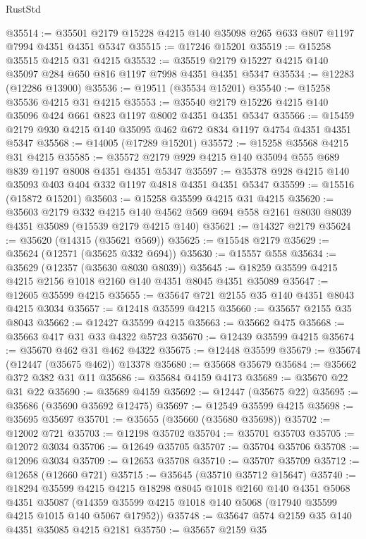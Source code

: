 \begin{lexlean}{RustStd}
\begin{coremodule}
@35514 := @35501 @2179 @15228 @4215 @140 @35098 @265 @633 @807 @1197 @7994 @4351 @4351 @5347
@35515 := @17246 @15201
@35519 := @15258 @35515 @4215 @31 @4215
@35532 := @35519 @2179 @15227 @4215 @140 @35097 @284 @650 @816 @1197 @7998 @4351 @4351 @5347
@35534 := @12283 (@12286 @13900)
@35536 := @19511 (@35534 @15201)
@35540 := @15258 @35536 @4215 @31 @4215
@35553 := @35540 @2179 @15226 @4215 @140 @35096 @424 @661 @823 @1197 @8002 @4351 @4351 @5347
@35566 := @15459 @2179 @930 @4215 @140 @35095 @462 @672 @834 @1197 @4754 @4351 @4351 @5347
@35568 := @14005 (@17289 @15201)
@35572 := @15258 @35568 @4215 @31 @4215
@35585 := @35572 @2179 @929 @4215 @140 @35094 @555 @689 @839 @1197 @8008 @4351 @4351 @5347
@35597 := @35378 @928 @4215 @140 @35093 @403 @404 @332 @1197 @4818 @4351 @4351 @5347
@35599 := @15516 (@15872 @15201)
@35603 := @15258 @35599 @4215 @31 @4215
@35620 := @35603
    @2179
    @332
    @4215
    @140
    @4562
    @569
    @694
    @558
    @2161
    @8030
    @8039
    @4351
    @35089
    (@15539 @2179 @4215 @140)
@35621 := @14327 @2179
@35624 := @35620 (@14315 (@35621 @569))
@35625 := @15548 @2179
@35629 := @35624 (@12571 (@35625 @332 @694))
@35630 := @15557 @558
@35634 := @35629 (@12357 (@35630 @8030 @8039))
@35645 := @18259 @35599 @4215 @4215 @2156 @1018 @2160 @140 @4351 @8045 @4351 @35089
@35647 := @12605 @35599 @4215
@35655 := @35647 @721 @2155 @35 @140 @4351 @8043 @4215 @3034
@35657 := @12418 @35599 @4215
@35660 := @35657 @2155 @35 @8043
@35662 := @12427 @35599 @4215
@35663 := @35662 @475
@35668 := @35663 @417 @31 @33 @4322 @5723
@35670 := @12439 @35599 @4215
@35674 := @35670 @462 @31 @462 @4322
@35675 := @12448 @35599
@35679 := @35674 (@12447 (@35675 @462)) @13378
@35680 := @35668 @35679
@35684 := @35662 @372 @382 @31 @11
@35686 := @35684 @4159 @4173
@35689 := @35670 @22 @31 @22
@35690 := @35689 @4159
@35692 := @12447 (@35675 @22)
@35695 := @35686 (@35690 @35692 @12475)
@35697 := @12549 @35599 @4215
@35698 := @35695 @35697
@35701 := @35655 (@35660 (@35680 @35698))
@35702 := @12002 @721
@35703 := @12198 @35702
@35704 := @35701 @35703
@35705 := @12072 @3034
@35706 := @12649 @35705
@35707 := @35704 @35706
@35708 := @12096 @3034
@35709 := @12653 @35708
@35710 := @35707 @35709
@35712 := @12658 (@12660 @721)
@35715 := @35645 (@35710 @35712 @15647)
@35740 := @18294
    @35599
    @4215
    @4215
    @18298
    @8045
    @1018
    @2160
    @140
    @4351
    @5068
    @4351
    @35087
    (@14359 @35599 @4215 @1018 @140 @5068 (@17940 @35599 @4215 @1015 @140 @5067 @17952))
@35748 := @35647 @574 @2159 @35 @140 @4351 @35085 @4215 @2181
@35750 := @35657 @2159 @35

\end{coremodule}
\end{lexlean}
